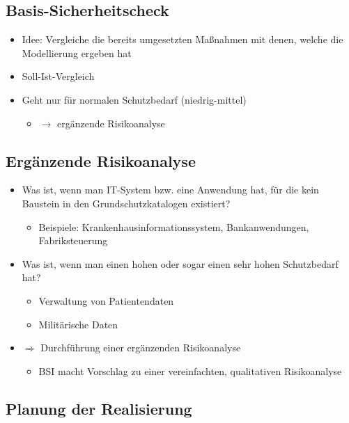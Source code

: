 \documentclass[openany]{book}
\begin{document}
\subsection{Basis-Sicherheitscheck}

\begin{itemize}
    \item Idee: Vergleiche die bereits umgesetzten Maßnahmen mit denen, welche die Modellierung ergeben hat
    \item Soll-Ist-Vergleich
    \item Geht nur für normalen Schutzbedarf (niedrig-mittel)
    \begin{itemize}
        \item $\rightarrow$ ergänzende Risikoanalyse
    \end{itemize}
\end{itemize}

\subsection{Ergänzende Risikoanalyse}

\begin{itemize}
    \item Was ist, wenn man IT-System bzw. eine Anwendung hat, für die kein Baustein in den Grundschutzkatalogen existiert?
    \begin{itemize}
        \item Beispiele: Krankenhausinformationssystem, Bankanwendungen, Fabriksteuerung
    \end{itemize}
    \item Was ist, wenn man einen hohen oder sogar einen sehr hohen Schutzbedarf hat?
    \begin{itemize}
        \item Verwaltung von Patientendaten
        \item Militärische Daten 
    \end{itemize}
    \item $\Rightarrow$ Durchführung einer ergänzenden Risikoanalyse
    \begin{itemize}
        \item BSI macht Vorschlag zu einer vereinfachten, qualitativen Risikoanalyse
    \end{itemize}
\end{itemize}

\subsection{Planung der Realisierung}
\end{document}
